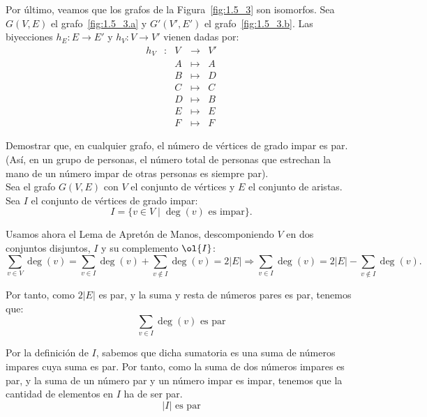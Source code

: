 \begin{ejercicio}
    Por último, veamos que los grafos de la Figura~\ref{fig:1.5_3} son isomorfos. Sea $G(V,E)$ el grafo~\ref{fig:1.5_3.a} y $G'(V',E')$ el grafo~\ref{fig:1.5_3.b}.
    Las biyecciones $h_E:E\to E'$ y $h_V:V\to V'$ vienen dadas por:
    \begin{equation*}
        \begin{array}{rlccc}
            h_V & : & V & \to & V'\\
            &  & A & \mapsto & A\\
            &  & B & \mapsto & D\\
            &  & C & \mapsto & C\\
            &  & D & \mapsto & B\\
            &  & E & \mapsto & E \\
            &  & F & \mapsto & F
        \end{array}
    \end{equation*}
\end{ejercicio}

\begin{ejercicio}\label{ej:1.6}
    Demostrar que, en cualquier grafo, el número de vértices de grado impar es par.
    (Así, en un grupo de personas, el número total de personas que estrechan la mano de un número impar de otras personas es siempre par).\\

    Sea el grafo $G(V,E)$ con $V$ el conjunto de vértices y $E$ el conjunto de aristas.    
    Sea $I$ el conjunto de vértices de grado impar:
    \begin{equation*}
        I=\{v\in V\mid \deg(v)\text{ es impar}\}.
    \end{equation*}

    Usamos ahora el Lema de Apretón de Manos, descomponiendo $V$ en dos conjuntos disjuntos, $I$ y su complemento $\ol{I}$:
    \begin{equation*}
        \sum_{v\in V}\deg(v)=\sum_{v\in I}\deg(v)+\sum_{v\notin I}\deg(v) =
        2|E| \Longrightarrow
        \sum_{v\in I}\deg(v) = 2|E| - \sum_{v\notin I}\deg(v).
    \end{equation*}

    Por tanto, como $2|E|$ es par, y la suma y resta de números pares es par, tenemos que:
    \begin{equation*}
        \sum_{v\in I}\deg(v) \text{ es par}
    \end{equation*}

    Por la definición de $I$, sabemos que dicha sumatoria es una suma de números impares cuya suma es par. Por tanto, como la suma de dos números impares es par, y la suma de un número par y un número impar es impar, tenemos que la cantidad de elementos en $I$ ha de ser par.
    \begin{equation*}
        |I| \text{ es par}
    \end{equation*}
\end{ejercicio}

